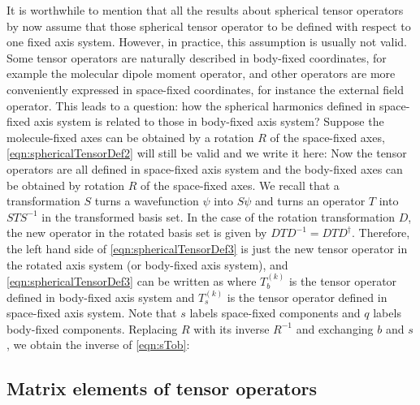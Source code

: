 It is worthwhile to mention that all the results about spherical tensor operators by now assume that those spherical
tensor operator to be defined with respect to one fixed axis system. However,
 in practice, this assumption is usually not valid. Some tensor operators are naturally described in body-fixed coordinates, for example the molecular
dipole moment operator, and other operators are more conveniently expressed in space-fixed coordinates, for instance
the external field operator.  This leads to a question:  how the spherical harmonics defined in space-fixed axis system 
is related to those in body-fixed axis system?  
Suppose the molecule-fixed axes can be obtained by a rotation $R$ of the 
space-fixed axes, \autoref{eqn:sphericalTensorDef2} will still be valid and we write it here:
Now the tensor operators are all defined in space-fixed axis system and the body-fixed axes can be obtained by rotation 
$R$ of the space-fixed axes. We recall that a transformation $S$ turns a wavefunction $\psi$ into  $S\psi$ and  turns 
an operator $T$ into $S T S^{-1}$ in the transformed basis set. In the case of the rotation transformation $D$, 
the new operator in the rotated basis set is given by $D T D^{-1} = D T D^{\dagger}$. Therefore, the left hand side of
\autoref{eqn:sphericalTensorDef3} is just the new tensor operator in the rotated axis system (or body-fixed axis
 system), and \autoref{eqn:sphericalTensorDef3} can be written as
where $T_{b}^{(k)}$ is the tensor operator defined in body-fixed axis system and $T_{s}^{(k)}$ is the tensor operator
defined in space-fixed axis system. Note that $s$ labels space-fixed components and $q$ labels body-fixed 
components. Replacing $R$ with its inverse $R^{-1}$ and exchanging $b$ and $s$, we obtain the inverse of
 \autoref{eqn:sTob}:


\subsection{Matrix elements of tensor operators} 

